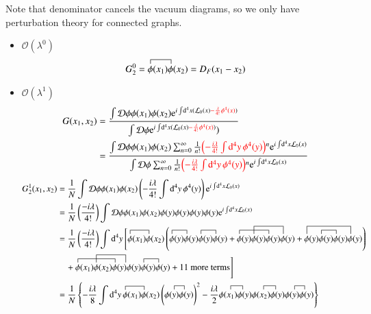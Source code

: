 Note that denominator cancels the vacuum diagrams, so we only have perturbation theory for connected graphs.
\begin{itemize}
   \item $\mathcal{O}(\lambda^0)$ 
      \begin{align}
         G_2^0 = \contraction{}{\phi}{(x_1)}{\phi}{} \phi(x_1) \phi(x_2 ) = D_F (x_1 - x_2)
      \end{align}
   \item $\mathcal{O}(\lambda^1)$ 
   \begin{align*}
      G(x_1, x_2) &= \frac{\int \mathcal{D} \phi \phi(x_1) \phi(x_2) \mathrm{e}^{i\int \dd[4]{x} (\mathcal{L}_0(x) \textcolor{red}{- \frac{\lambda}{4!} \phi^4 (x)})}}{\int \mathcal{D} \phi  \mathrm{e}^{i\int \dd[4]{x} (\mathcal{L}_0(x) \textcolor{red}{- \frac{\lambda}{4!} \phi^4 (x)})})} \\
                  &= \frac{\int \mathcal{D} \phi \phi(x_1) \phi(x_2) \sum_{n=0}^\infty \frac{1}{n!} \textcolor{red}{\left( -\frac{i\lambda}{4!} \int \dd[4]{y} \phi^4(y) \right)}^n \mathrm{e}^{i\int \dd[4]{x} \mathcal{L}_0(x)}}{\int \mathcal{D} \phi \sum_{n=0}^\infty \frac{1}{n!} \textcolor{red}{\left( -\frac{i\lambda}{4!} \int \dd[4]{y} \phi^4(y) \right)}^n \mathrm{e}^{i\int \dd[4]{x} \mathcal{L}_0(x)}}
   \end{align*}
      \begin{align*}
         G_2^1 (x_1, x_2) &= \frac{1}{N} \int \D \phi \phi(x_1) \phi(x_2) \left( -\frac{i\lambda}{4!} \int \dd[4]{y} \phi^4(y) \right) \euler^{i\int \dd[4]{x} \lag_0(x)}   \\
                          &= \frac{1}{N} \left( \frac{-i\lambda}{4!} \right) \int \D \phi \phi(x_1) \phi(x_2) \phi(y) \phi(y) \phi(y) \phi(y) \euler^{i\int \dd[4]{x} \lag_0(x)} \\
                          &=  \frac{1}{N} \left( \frac{-i\lambda}{4!} \right) \int \dd[4]{y} \Bigg[ \contraction{}{\phi}{(x_1)}{\phi}{} \phi(x_1) \phi(x_2 ) \left( 
                              \contraction{}{\phi}{(y)}{\phi}{} \phi(y) \phi(y)\contraction{}{\phi}{(y)}{\phi}{} \phi(y) \phi(y) 
                              + \contraction{}{\phi}{(y)\phi(y)}{\phi}  \contraction[2ex]{\phi(y)}{\phi}{(y)\phi(y)}{\phi}\phi(y) \phi(y) \phi(y)\phi(y)
                              + \contraction[2ex]{}{\phi}{(y)\phi(y)\phi(y)}{\phi}  \contraction{\phi(y)}{\phi}{(y)}{\phi} \phi(y) \phi(y) \phi(y)\phi(y)
                           \right)  \\
                          &\quad + \contraction{}{\phi}{(x_1)\phi(x_2)}{\phi}  \contraction[2ex]{\phi(x_2)}{\phi}{(y)\phi(y)}{\phi} \phi(x_1) \phi(x_2) \phi(y)\phi(y) 
                          \contraction{}{\phi}{(y)}{\phi}{} \phi(y) \phi(y) + \text{$11$ more terms}  \Bigg] \\
                          &= \frac{1}{N} \left\{ - \frac{i\lambda}{8} \int \dd[4]{y} \contraction{}{\phi}{(x_1)}{\phi} \phi(x_1) \phi(x_2) \left(\contraction{\phi}{(y)}{\phi}{} \phi(y) \phi(y) \right)^2
                              - \frac{i\lambda}{2} \contraction{\phi}{(x_1)}{\phi}{} \phi(x_1) \phi(y)  \contraction{\phi}{(x_2)}{\phi}{} \phi(x_2) \phi(y) \contraction{\phi}{(y)}{\phi}{} \phi(y) \phi(y) \right\}
      \end{align*}
\end{itemize}

